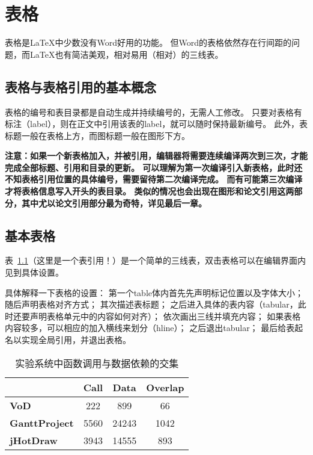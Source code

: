 \chapter{表格}

表格是LaTeX中少数没有Word好用的功能。
但Word的表格依然存在行间距的问题，而LaTeX也有简洁美观，相对易用（相对）的三线表。

\section{表格与表格引用的基本概念}
表格的编号和表目录都是自动生成并持续编号的，无需人工修改。
只要对表格有标注（label），则在正文中引用该表的label，就可以随时保持最新编号。
此外，表标题一般在表格上方，而图标题一般在图形下方。

\textbf{注意：如果一个新表格加入，并被引用，编辑器将需要连续编译两次到三次，才能完成全部标题、引用和目录的更新。
可以理解为第一次编译引入新表格，此时还不知表格引用位置的具体编号，需要留待第二次编译完成。
而有可能第三次编译才将表格信息写入开头的表目录。
类似的情况也会出现在图形和论文引用这两部分，其中尤以论文引用部分最为奇特，详见最后一章。}

\section{基本表格}

表~\ref{table:codeOverlap}（这里是一个表引用！）是一个简单的三线表，双击表格可以在编辑界面内见到具体设置。

具体解释一下表格的设置：
第一个table体内首先先声明标记位置以及字体大小；
随后声明表格对齐方式；
其次描述表标题；
之后进入具体的表内容（tabular，此时还要声明表格单元中的内容如何对齐）；
依次画出三线并填充内容；
如果表格内容较多，可以相应的加入横线来划分（hline）；
之后退出tabular；
最后给表起名以实现全局引用，并退出表格。

\begin{table}[htb]
	\footnotesize
	\centering
	\caption{实验系统中函数调用与数据依赖的交集}
	\label{table:codeOverlap}
	\vspace{2mm}
	\begin{tabular}{lccc}
		\toprule
		& \textbf{Call} & \textbf{Data} & \textbf{Overlap} \\
		\midrule
		\textbf{VoD}&222&899&66 \\
		\textbf{GanttProject}&5560&24243&1042 \\
		\hline
		\textbf{jHotDraw}&3943&14555&893 \\
		\bottomrule
	\end{tabular}
\end{table}

